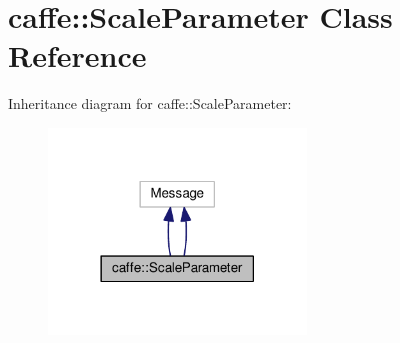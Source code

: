 \hypertarget{classcaffe_1_1_scale_parameter}{}\section{caffe\+:\+:Scale\+Parameter Class Reference}
\label{classcaffe_1_1_scale_parameter}


Inheritance diagram for caffe\+:\+:Scale\+Parameter\+:
\nopagebreak
\begin{figure}[H]
\begin{center}
\leavevmode
\includegraphics[width=194pt]{classcaffe_1_1_scale_parameter__inherit__graph}
\end{center}
\end{figure}
